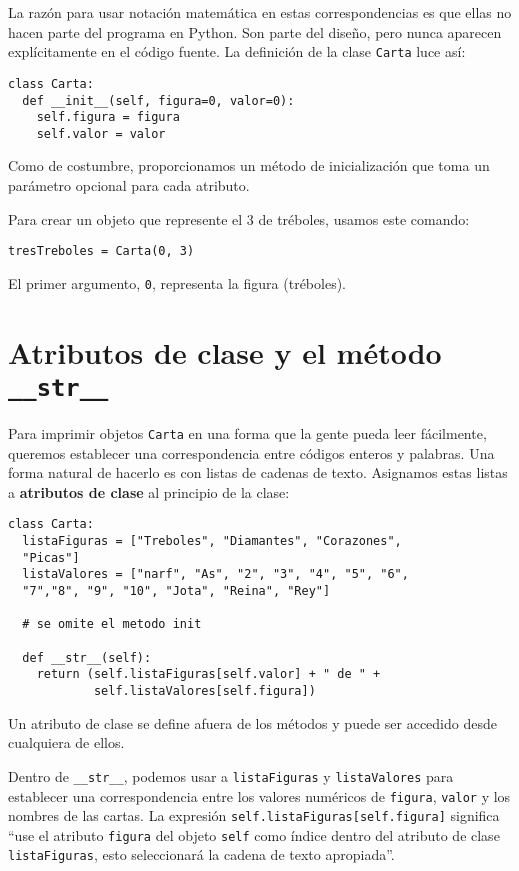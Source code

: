 La razón para usar notación matemática en estas correspondencias es que ellas
no hacen parte del programa en Python. Son parte del diseño, pero nunca 
aparecen explícitamente en el código fuente. La definición de la clase
 \texttt{Carta} luce así:

\beforeverb
\begin{verbatim}
class Carta:
  def __init__(self, figura=0, valor=0):
    self.figura = figura
    self.valor = valor
\end{verbatim}
\afterverb
%
Como de costumbre, proporcionamos un método de inicialización que toma
un parámetro opcional para cada atributo.


Para crear un objeto que represente el 3 de tréboles, usamos este comando:

\beforeverb
\begin{verbatim}
tresTreboles = Carta(0, 3)
\end{verbatim}
\afterverb
%
El primer argumento, \texttt{0}, representa la figura (tréboles).


\section{Atributos de clase y el método \texttt{\_\_str\_\_}}

Para imprimir objetos \texttt{Carta} en una forma que la gente pueda 
leer fácilmente, queremos establecer una correspondencia entre códigos
enteros y palabras. Una forma natural de hacerlo es con listas de 
cadenas de texto. Asignamos estas listas a  {\bf atributos de  clase} 
al principio de la clase:

\beforeverb
\begin{verbatim}
class Carta:
  listaFiguras = ["Treboles", "Diamantes", "Corazones", 
  "Picas"]
  listaValores = ["narf", "As", "2", "3", "4", "5", "6", 
  "7","8", "9", "10", "Jota", "Reina", "Rey"]

  # se omite el metodo init

  def __str__(self):
    return (self.listaFiguras[self.valor] + " de " + 
            self.listaValores[self.figura])
\end{verbatim}
\afterverb
%
Un atributo de clase se define afuera de los métodos y puede ser accedido
desde cualquiera de ellos.

Dentro de \texttt{\_\_str\_\_}, podemos usar a \texttt{listaFiguras} y \texttt{listaValores}
para establecer una correspondencia entre los valores numéricos de \texttt{figura}, \texttt{valor} 
y los nombres de las cartas. La expresión \verb+self.listaFiguras[self.figura]+ significa
``use el atributo  \texttt{figura} del objeto \texttt{self} como índice dentro
del atributo de clase \texttt{listaFiguras}, esto seleccionará la cadena de texto apropiada''.

